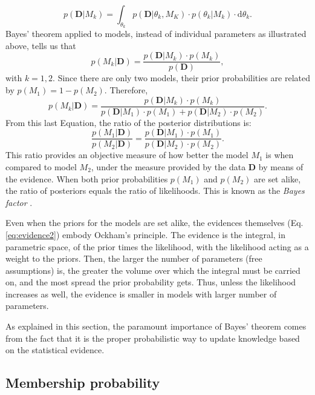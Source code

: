  \begin{equation}
p(\mathbf{D}|M_k)=\int_{\theta_k} p(\mathbf{D}|\theta_k,M_K)\cdot p(\theta_k|M_k)\cdot \mathrm{d}\theta_k. \label{eq:evidence2}
\end{equation}
Bayes' theorem applied to models, instead of individual parameters as illustrated above, tells us that
\begin{equation}
p(M_k|\mathbf{D})=\frac{p(\mathbf{D}|M_k)\cdot p(M_k)}{p(\mathbf{D})},
\end{equation}
with $k=1,2$. Since there are only two models, their prior probabilities are related by $p(M_1)= 1- p(M_2)$. Therefore,
 \begin{equation}
p(M_k|\mathbf{D})=\frac{p(\mathbf{D}|M_k)\cdot p(M_k)}{p(\mathbf{D}|M_1)\cdot p(M_1)+p(\mathbf{D}|M_2)\cdot p(M_2)}.
\end{equation}
From this last Equation, the ratio of the posterior distributions is:
\begin{equation}
\label{eq:modelselection}
\frac{p(M_1|\mathbf{D})}{p(M_2|\mathbf{D})}=\frac{p(\mathbf{D}|M_1)\cdot p(M_1)}{p(\mathbf{D}|M_2)\cdot p(M_2)}.
\end{equation}
This ratio provides an objective measure of how better the model $M_1$ is when compared to model $M_2$, under the measure provided by the data $\mathbf{D}$ by means of the evidence. When both prior probabilities  $p(M_1)$ and $p(M_2)$ are set alike, the ratio of posteriors equals the ratio of likelihoods. This is known as the \emph{Bayes factor} \cite[for a similar derivation and some examples of its application see][]{Kaas1995}. 

Even when the priors for the models are set alike, the evidences themselves (Eq. \ref{eq:evidence2}) embody Ockham's principle. The evidence is the integral, in parametric space, of the prior times the likelihood, with the likelihood acting as a weight to the priors.  Then, the larger the number of parameters (free assumptions) is, the greater the volume over which the integral must be carried on, and the most spread the prior probability gets. Thus, unless the likelihood increases as well, the evidence is smaller in models with larger number of parameters.

As explained in this section, the paramount importance of Bayes' theorem comes from the fact that it is the proper probabilistic way to update knowledge based on the {statistical} evidence.

\subsection{Membership probability}

